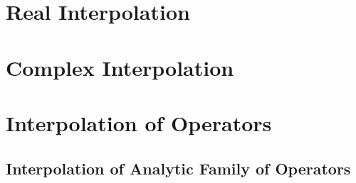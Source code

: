 \documentclass[Total.tex]{subfiles}
\begin{document}
		\section{Real Interpolation}
		\section{Complex Interpolation}
		\section{Interpolation of Operators}
			\subsection{Interpolation of Analytic Family of Operators}
\end{document}
